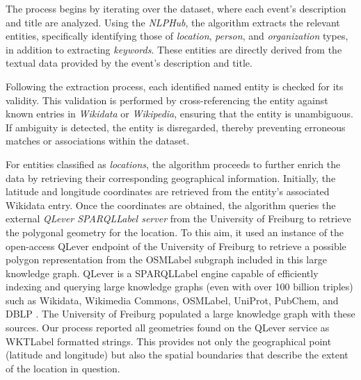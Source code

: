 The process begins by iterating over the dataset, where each event's description and title are analyzed. Using the \textit{NLPHub}\cite{coro2021nlphub}, the algorithm extracts the relevant entities, specifically identifying those of \emph{location}, \emph{person}, and \emph{organization} types, in addition to extracting \emph{keywords}. These entities are directly derived from the textual data provided by the event's description and title.

Following the extraction process, each identified named entity is checked for its validity. This validation is performed by cross-referencing the entity against known entries in \textit{Wikidata} or \textit{Wikipedia}, ensuring that the entity is unambiguous. If ambiguity is detected, the entity is disregarded, thereby preventing erroneous matches or associations within the dataset.

For entities classified as \emph{locations}, the algorithm proceeds to further enrich the data by retrieving their corresponding geographical information. Initially, the latitude and longitude coordinates are retrieved from the entity's associated Wikidata entry. Once the coordinates are obtained, the algorithm queries the external \textit{QLever \acrshort{SPARQLLabel} server} from the University of Freiburg to retrieve the polygonal geometry for the location. To this aim, it used an instance of the open-access QLever endpoint of the University of Freiburg \cite{qleverinstance2024} to retrieve a possible polygon representation from the \acrshort{OSMLabel} subgraph included in this large knowledge graph. QLever is a \acrshort{SPARQLLabel} engine capable of efficiently indexing and querying large knowledge graphs (even with over 100 billion triples) such as Wikidata, Wikimedia Commons, \acrshort{OSMLabel}, UniProt, PubChem, and DBLP \cite{bast2017qlever}. The University of Freiburg populated a large knowledge graph with these sources. Our process reported all geometries found on the QLever service as \acrshort{WKTLabel} formatted strings\cite{WellknownTextRepresentationa}. This provides not only the geographical point (latitude and longitude) but also the spatial boundaries that describe the extent of the location in question.



